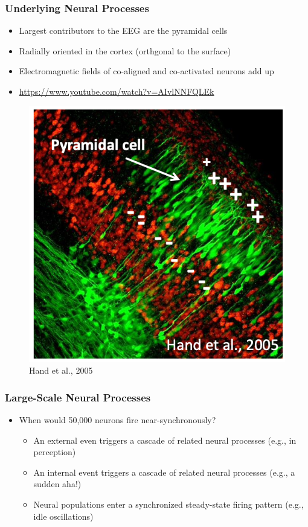 \documentclass{beamer}
\begin{document}
\begin{frame}
\frametitle{Underlying Neural Processes}
\begin{itemize}
	\item Largest contributors to the EEG are the pyramidal cells
	\item Radially oriented in the cortex (orthgonal to the surface)
	\item Electromagnetic fields of co-aligned and co-activated neurons add up
	\item \url{https://www.youtube.com/watch?v=AIvlNNFQLEk}
\end{itemize}
	\begin{figure}
		\includegraphics[width=0.3\linewidth]{image/pyra}
		\caption{Hand et al., 2005}
	\end{figure}
\end{frame}

\begin{frame}
\frametitle{Large-Scale Neural Processes}
\begin{itemize}
	\item When would 50,000 neurons fire near-synchronously?
	\begin{itemize}
		\item An external even triggers a cascade of related neural processes (e.g., in perception)
		\item An internal event triggers a cascade of related neural processes (e.g., a sudden aha!)
		\item Neural populations enter a synchronized steady-state firing pattern (e.g., idle oscillations)
	\end{itemize}
\end{itemize}
\end{frame}
\end{document}
